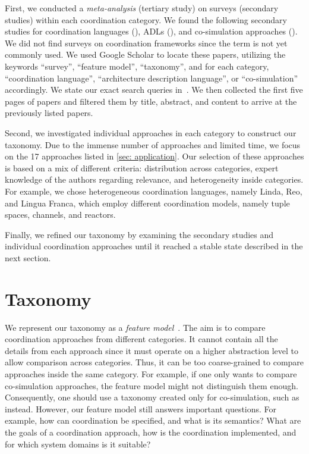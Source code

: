 \documentclass[runningheads]{llncs}
\newcommand{\quotes}[1]{``#1''}
\begin{document}
First, we conducted a \textit{meta-analysis} (tertiary study) on surveys (secondary studies) within each coordination category.
We found the following  secondary studies for coordination languages (\cite{papadopoulosCoordinationModelsLanguages1998,goosCoordinationModelsLanguages2001,rossiTuplebasedTechnologiesCoordination2001}), ADLs (\cite{clementsSurveyArchitectureDescription1996,medvidovicClassificationComparisonFramework2000,hussainInvestigatingArchitectureDescription2013,ozkayaAreWeThere2013,malavoltaWhatIndustryNeeds2013}), and co-simulation approaches (\cite{gomesCoSimulationSurvey2019,schweigerEmpiricalSurveyCosimulation2019,hafnerOverviewStateArt2021}).
We did not find surveys on coordination frameworks since the term is not yet commonly used.
We used Google Scholar to locate these papers, utilizing the keywords \quotes{survey}, \quotes{feature model}, \quotes{taxonomy}, and for each category, \quotes{coordination language}, \quotes{architecture description language}, or \quotes{co-simulation} accordingly.
We state our exact search queries in~\cite{timkrauterArtifactsCoordination2024}.
We then collected the first five pages of papers and filtered them by title, abstract, and content to arrive at the previously listed papers.

Second, we investigated individual approaches in each category to construct our taxonomy.
Due to the immense number of approaches and limited time, we focus on the 17 approaches listed in \autoref{sec: application}.
Our selection of these approaches is based on a mix of different criteria: distribution across categories, expert knowledge of the authors regarding relevance, and heterogeneity inside categories.
For example, we chose heterogeneous coordination languages, namely Linda, Reo, and Lingua Franca, which employ different coordination models, namely tuple spaces, channels, and reactors.

Finally, we refined our taxonomy by examining the secondary studies and individual coordination approaches until it reached a stable state described in the next section.

\section{Taxonomy} \label{sec: taxonomy}
We represent our taxonomy as a \textit{feature model}~\cite{kangFeatureOrientedDomainAnalysis1990}.
The aim is to compare coordination approaches from different categories.
It cannot contain all the details from each approach since it must operate on a higher abstraction level to allow comparison across categories.
Thus, it can be too coarse-grained to compare approaches inside the same category.
For example, if one only wants to compare co-simulation approaches, the feature model might not distinguish them enough.
Consequently, one should use a taxonomy created only for co-simulation, such as~\cite{gomesCoSimulationSurvey2019} instead.
However, our feature model still answers important questions.
For example, how can coordination be specified, and what is its semantics?
What are the goals of a coordination approach, how is the coordination implemented, and for which system domains is it suitable?
\end{document}

